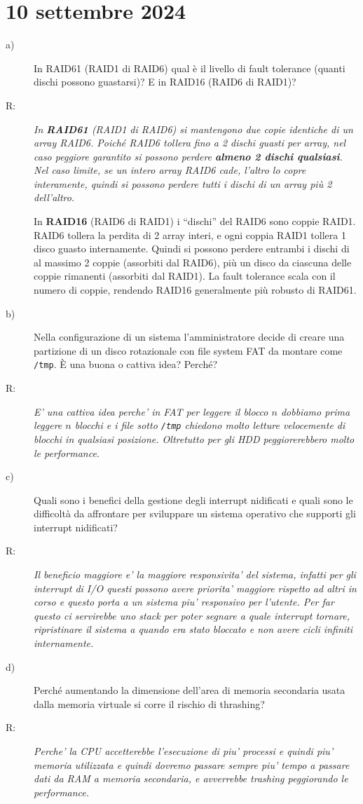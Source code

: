 \documentclass[a4paper,12pt]{article}
\newcommand{\datasection}[1]{%
    \section*{#1}%
    \addcontentsline{toc}{section}{#1}%
}
\newenvironment{exambox}{%
    \begin{mdframed}[
        linecolor=black!70,
        linewidth=0.6pt,
        innerleftmargin=8pt,
        innerrightmargin=8pt,
        innertopmargin=6pt,
        innerbottommargin=6pt
    ]
    \begin{description}
}{%
    \end{description}
    \end{mdframed}
}
\begin{document}
\newpage
\datasection{10 settembre 2024}
\begin{exambox}
\item[a)] In RAID61 (RAID1 di RAID6) qual è il livello di fault tolerance (quanti dischi possono guastarsi)? E in RAID16 (RAID6 di RAID1)?
\item[R:] {\itshape
In \textbf{RAID61} (RAID1 di RAID6) si mantengono due copie identiche di un array RAID6.
Poiché RAID6 tollera fino a 2 dischi guasti per array, nel caso peggiore garantito
si possono perdere \textbf{almeno 2 dischi qualsiasi}. Nel caso limite, se un intero
array RAID6 cade, l'altro lo copre interamente, quindi si possono perdere tutti i
dischi di un array più 2 dell'altro.

In \textbf{RAID16} (RAID6 di RAID1) i ``dischi'' del RAID6 sono coppie RAID1.
RAID6 tollera la perdita di 2 array interi, e ogni coppia RAID1 tollera 1 disco
guasto internamente. Quindi si possono perdere entrambi i dischi di al massimo
2 coppie (assorbiti dal RAID6), più un disco da ciascuna delle coppie rimanenti
(assorbiti dal RAID1). La fault tolerance scala con il numero di coppie, rendendo
RAID16 generalmente più robusto di RAID61.
}
\item[b)] Nella configurazione di un sistema l'amministratore decide di creare una partizione di un disco rotazionale con file system FAT da montare come \texttt{/tmp}. È una buona o cattiva idea? Perché?
\item[R:] \textit{E' una cattiva idea perche' in FAT per leggere il blocco $n$ dobbiamo prima leggere $n$ blocchi e i file sotto \texttt{/tmp} chiedono molto letture velocemente di blocchi in qualsiasi posizione. Oltretutto per gli HDD peggiorerebbero molto le performance.} 
\item[c)] Quali sono i benefici della gestione degli interrupt nidificati e quali sono le difficoltà da affrontare per sviluppare un sistema operativo che supporti gli interrupt nidificati?
\item[R:] \textit{Il beneficio maggiore e' la maggiore responsivita' del sistema, infatti per gli interrupt di I/O questi possono avere priorita' maggiore rispetto ad altri in corso e questo porta a un sistema piu' responsivo per l'utente. Per far questo ci servirebbe uno stack per poter segnare a quale interrupt tornare, ripristinare il sistema a quando era stato bloccato e non avere cicli infiniti internamente.}
\item[d)] Perché aumentando la dimensione dell'area di memoria secondaria usata dalla memoria virtuale si corre il rischio di thrashing?
\item[R:] \textit{Perche' la CPU accetterebbe l'esecuzione di piu' processi e quindi piu' memoria utilizzata e quindi dovremo passare sempre piu' tempo a passare dati da RAM a memoria secondaria, e avverrebbe trashing peggiorando le performance.}
\end{exambox}
\end{document}
